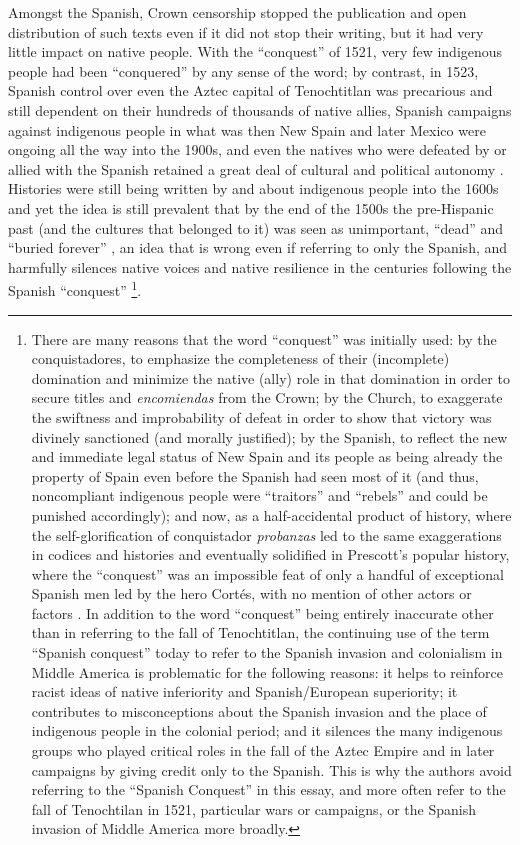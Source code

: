 Amongst the Spanish, Crown censorship stopped the publication and open distribution of such texts even if it did not stop their writing, but it had very little impact on native people. With the “conquest” of 1521, very few indigenous people had been “conquered” by any sense of the word; by contrast, in 1523, Spanish control over even the Aztec capital of Tenochtitlan was precarious and still dependent on their hundreds of thousands of native allies, Spanish campaigns against indigenous people in what was then New Spain and later Mexico were ongoing all the way into the 1900s, and even the natives who were defeated by or allied with the Spanish retained a great deal of cultural and political autonomy \parencite[70-73]{Restall2003}. 
Histories were still being written by and about indigenous people into the 1600s and yet the idea is still prevalent that by the end of the 1500s the pre-Hispanic past (and the cultures that belonged to it) was seen as unimportant, “dead” and “buried forever” \parencite[17]{Matos1995}, 
an idea that is wrong even if referring to only the Spanish, and harmfully silences native voices and native resilience in the centuries following the Spanish “conquest”
\footnote{There are many reasons that the word “conquest” was initially used: by the conquistadores, to emphasize the completeness of their (incomplete) domination and minimize the native (ally) role in that domination in order to secure titles and \emph{encomiendas} from the Crown; by the Church, to exaggerate the swiftness and improbability of defeat in order to show that victory was divinely sanctioned (and morally justified); by the Spanish, to reflect the new and immediate legal status of New Spain and its people as being already the property of Spain even before the Spanish had seen most of it (and thus, noncompliant indigenous people were “traitors” and “rebels” and could be punished accordingly); and now, as a half-accidental product of history, where the self-glorification of conquistador \emph{probanzas} led to the same exaggerations in codices and histories and eventually solidified in Prescott’s popular history, where the “conquest” was an impossible feat of only a handful of exceptional Spanish men led by the hero Cortés, with no mention of other actors or factors \parencite[13,15,68]{Restall2003}. In addition to the word “conquest” being entirely inaccurate other than in referring to the fall of Tenochtitlan, the continuing use of the term “Spanish conquest” today to refer to the Spanish invasion and colonialism in Middle America is problematic for the following reasons: it helps to reinforce racist ideas of native inferiority and Spanish/European superiority; it contributes to misconceptions about the Spanish invasion and the place of indigenous people in the colonial period; and it silences the many indigenous groups who played critical roles in the fall of the Aztec Empire and in later campaigns by giving credit only to the Spanish. This is why the authors avoid referring to the “Spanish Conquest” in this essay, and more often refer to the fall of Tenochtilan in 1521, particular wars or campaigns, or the Spanish invasion of Middle America more broadly.}.

